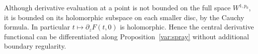 \begin{remark}\label{var:center-derivative}
Although derivative evaluation at a point is not bounded on the full
space $W^{1,p_0}$, it is bounded on its holomorphic subspace on each
smaller disc, by the Cauchy formula.  In particular
$t\mapsto \partial_zF(t,0)$ is holomorphic.  Hence the central
derivative functional can be differentiated along
Proposition~\ref{var:spray} without additional boundary regularity.
\end{remark}
